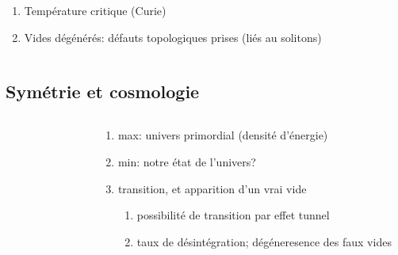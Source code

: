 \documentclass[handout]{beamer}
\begin{document}
\begin{frame}
\begin{columns}[T]
\begin{column}[T]{.5\linewidth}
    \begin{enumerate}
    \item Température critique (Curie)
    \item Vides dégénérés: défauts topologiques prises (liés au solitons)
    \end{enumerate}
    \end{column}
	\begin{column}{.5\linewidth}
    \begin{figure}[0.3\textwidth]
    \end{figure}
 
	\end{column}
	
\end{columns}
\end{frame}
\subsection{Symétrie et cosmologie}
\begin{frame}

\begin{columns}[T]
    \begin{column}[T]{.5\linewidth}
   \begin{figure}[0.3\textwidth]
    \end{figure}
    \end{column}
    \begin{column}[T]{.5\linewidth}
    \begin{enumerate}
    \item max: univers primordial (densité d'énergie)
    \item min: notre état de l'univers?
    \item transition, et apparition d'un vrai vide
    \begin{enumerate}
    \item possibilité de transition par effet tunnel
    \item taux de désintégration; dégéneresence des faux vides
    \end{enumerate}
    \end{enumerate}
    \end{column}
  \end{columns}
  \end{frame}
  
\end{document}
